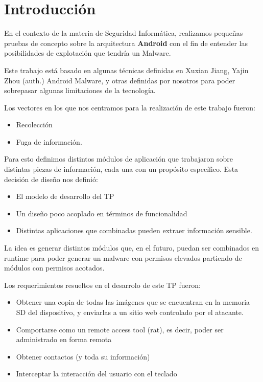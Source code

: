 \section{Introducci\'on}
En el contexto de la materia de Seguridad Inform\'atica, realizamos peque\~nas pruebas de concepto sobre la arquitectura \textbf{Android} con el fin de entender las posibilidades de explotaci\'on que tendr\'ia un Malware.

Este trabajo est\'a basado en algunas t\'ecnicas definidas en Xuxian Jiang,  Yajin Zhou  (auth.) Android Malware, y otras definidas por nosotros para poder sobrepasar algunas limitaciones de la tecnolog\'ia.

Los vectores en los que nos centramos para la realizaci\'on de este trabajo fueron:

\begin{itemize}
    \item Recolecci\'on 
    \item Fuga de informaci\'on.
\end{itemize}


Para esto definimos distintos módulos de aplicaci\'on que trabajaron sobre distintas piezas de informaci\'on, cada una con un prop\'osito espec\'ifico. Esta decisi\'on de dise\~no nos defini\'o:

\begin{itemize}
    \item El modelo de desarrollo del TP
    \item Un dise\~no poco acoplado en términos de funcionalidad
    \item Distintas aplicaciones que combinadas pueden extraer informaci\'on sensible.
\end{itemize}


La idea es generar distintos módulos que, en el futuro, puedan ser combinados en runtime para poder generar un malware con permisos elevados partiendo de módulos con permisos acotados.


Los requerimientos resueltos en el desarrolo de este TP fueron:
\begin{itemize}
    \item Obtener una copia de todas las im\'agenes que se encuentran en la memoria SD del dispositivo, y enviarlas a un sitio web controlado por el atacante.
    \item  Comportarse como un remote access tool (rat), es decir, poder ser administrado en forma remota
    \item  Obtener contactos (y toda su información)
    \item  Interceptar la interacci\'on del usuario con el teclado
\end{itemize}
